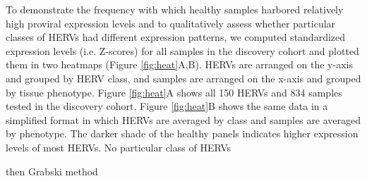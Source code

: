 To demonstrate the frequency with which healthy samples harbored relatively high proviral expression levels and to qualitatively assess whether particular classes of HERVs had different expression patterns, we computed standardized expression levels (i.e. Z-scores) for all samples in the discovery cohort and plotted them in two heatmaps (Figure \ref{fig:heat}A,B).
HERVs are arranged on the y-axis and grouped by HERV class, and samples are arranged on the x-axis and grouped by tissue phenotype.
Figure \ref{fig:heat}A shows all 150 HERVs and 834 samples tested in the discovery cohort.
Figure \ref{fig:heat}B shows the same data in a simplified format in which HERVs are averaged by class and samples are averaged by phenotype.
The darker shade of the healthy panels indicates higher expression levels of most HERVs.
No particular class of HERVs

then Grabski method
